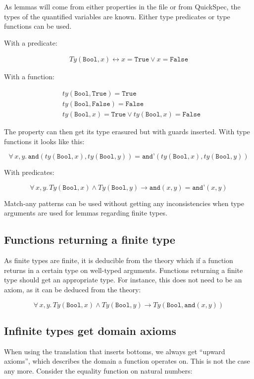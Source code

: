 \documentclass{article}
\newcommand\hs[1]{\texttt{#1}}
\newcommand\faa[2]{\forall \, #1 , #2 . \,}
\begin{document}
As lemmas will come from either properties in the file or from
QuickSpec, the types of the quantified variables are known. Either
type predicates or type functions can be used.

With a predicate:

\begin{align*}
  Ty(\hs{Bool},x) \leftrightarrow x = \hs{True} \vee x = \hs{False}
\end{align*}

With a function:

\begin{align*}
& ty(\hs{Bool},\hs{True})  = \hs{True} \\
& ty(\hs{Bool},\hs{False}) = \hs{False} \\
& ty(\hs{Bool},x) = \hs{True} \vee ty(\hs{Bool},x) = \hs{False}
\end{align*}

The property can then get its type erasured but with guards inserted.
With type functions it looks like this:

$$\faa{x}{y} \hs{and}(ty(\hs{Bool},x),ty(\hs{Bool},y)) = \hs{and'}(ty(\hs{Bool},x),ty(\hs{Bool},y))$$

With predicates:

$$\faa{x}{y} Ty(\hs{Bool},x) \wedge Ty(\hs{Bool},y) \rightarrow \hs{and}(x,y) = \hs{and'}(x,y)$$

Match-any patterns can be used without getting any inconsistencies
when type arguments are used for lemmas regarding finite types.

\subsection*{Functions returning a finite type}

As finite types are finite, it is deducible from the theory which
if a function returns in a certain type on well-typed arguments.
Functions returning a finite type should get an appropriate type.
For instance, this does not need to be an axiom, as it can be deduced
from the theory:

$$\faa{x}{y} Ty(\hs{Bool},x) \wedge Ty(\hs{Bool},y) \rightarrow Ty(\hs{Bool},\hs{and}(x,y))$$

\subsection*{Infinite types get domain axioms}

When using the translation that inserts bottoms, we always get
``upward axioms'', which describes the domain a function operates
on. This is not the case any more. Consider the equality function on
natural numbers:
\end{document}
